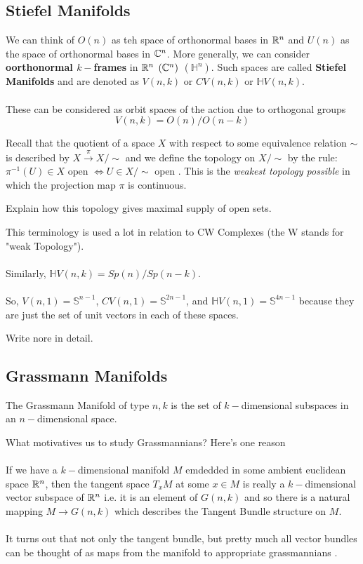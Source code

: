 \documentclass[11pt]{article}
\begin{document}
\subsection{Stiefel Manifolds}
We can think of $O(n)$ as teh space of orthonormal bases in $\mathbb{R}^n$ and $U(n)$ as the space of orthonormal bases in $\mathbb{C}^n$. More generally, we can consider \textbf{oorthonormal $k-$frames} in $\mathbb{R}^n$ $(\mathbb{C}^n)$ $(\mathbb{H}^n)$. Such spaces are called \textbf{Stiefel Manifolds} and are denoted as $V(n, k)$ or $CV(n, k)$ or $\mathbb{H}V(n, k)$.
\\
\\
These can be considered as orbit spaces of the action due to orthogonal groups 
\[ V(n, k) = O(n) / O(n - k) \]

Recall that the quotient of a space $X$ with respect to some equivalence relation $\sim$ is described by $X \xrightarrow{\pi} X/\sim$ and we define the topology on $X/\sim$ by the rule:
$\pi^{-1}(U) \in X \text{ open } \iff U \in X / \sim \text{ open }$. This is the \textit{weakest topology possible} in which the projection map $\pi$ is continuous. \begin{note}
{Explain how this topology gives maximal supply of open sets.}
\end{note} This terminology is used a lot in relation to CW Complexes (the W stands for "weak Topology").
\\
\\
Similarly, $\mathbb{H}V(n, k) = Sp(n)/Sp(n-k)$.
\\
\\
So, $V(n, 1) = \mathbb{S}^{n-1}$, $CV(n, 1) = \mathbb{S}^{2n-1}$, and $\mathbb{H}V(n, 1) = \mathbb{S}^{4n-1}$ because they are just the set of unit vectors in each of these spaces. \begin{note}
  {Write nore in detail}.
\end{note}

\subsection{Grassmann Manifolds}
The Grassmann Manifold of type $n,k$ is the set of $k-$dimensional subspaces in an $n-$dimensional space.

\begin{redbox}
  What motivatives us to study Grassmannians? Here's one reason\text{:}
  \\
  \\
  If we have a $k-$dimensional manifold $M$ emdedded in some ambient euclidean space $\mathbb{R}^n$, then the tangent space $T_x M$ at some $x \in M$ is really a $k-$dimensional vector subspace of $\mathbb{R}^n$ i.e. it is an element of $G(n, k)$ and so there is a natural mapping $M \rightarrow G(n, k)$ which describes the Tangent Bundle structure on $M$.
  \\
  \\
  It turns out that not only the tangent bundle, but pretty much all vector bundles can be thought of as maps from the manifold to appropriate grassmannians \cite{GrassmannianWikipedia}. 
\end{redbox}
\end{document}
